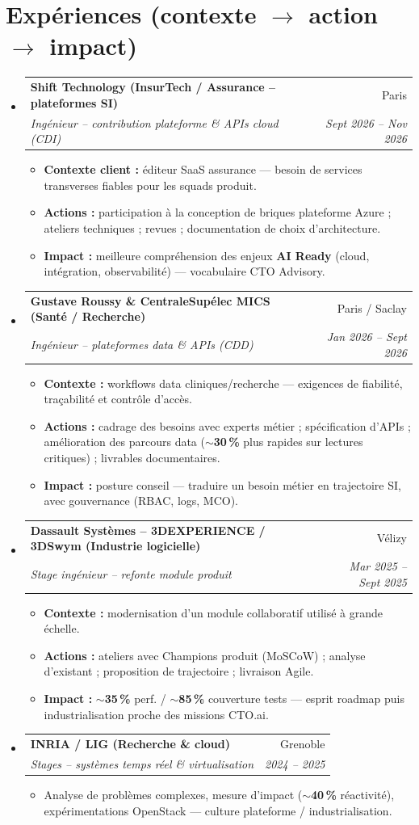 \documentclass[letterpaper,10.5pt]{article}
\makeatletter
\newcommand{\resumeItem}[1]{\item\small{#1 \vspace{-2pt}}}
\newcommand{\resumeSubheading}[4]{\vspace{-2pt}\item\begin{tabular*}{0.97\textwidth}[t]{l@{\extracolsep{\fill}}r}\textbf{#1} & #2 \\\textit{\small#3} & \textit{\small #4} \\\end{tabular*}\vspace{-6pt}}
\newcommand{\resumeSubHeadingListStart}{\begin{itemize}[leftmargin=0.12in, label={}]}
\newcommand{\resumeSubHeadingListEnd}{\end{itemize}}
\newcommand{\resumeItemListStart}{\begin{itemize}[leftmargin=0.15in]}
\newcommand{\resumeItemListEnd}{\end{itemize}\vspace{-4pt}}
\makeatother
\begin{document}
\section{Exp\'eriences (contexte $\rightarrow$ action $\rightarrow$ impact)}
\resumeSubHeadingListStart
  \resumeSubheading{Shift Technology (InsurTech / Assurance -- plateformes SI)}{Paris}{Ing\'enieur -- contribution plateforme \& APIs cloud (CDI)}{Sept 2026 -- Nov 2026}
    \resumeItemListStart
      \resumeItem{\textbf{Contexte client :} \'editeur SaaS assurance --- besoin de services transverses fiables pour les squads produit.}
      \resumeItem{\textbf{Actions :} participation \`a la conception de briques plateforme Azure ; ateliers techniques ; revues ; documentation de choix d'architecture.}
      \resumeItem{\textbf{Impact :} meilleure compr\'ehension des enjeux \textbf{AI Ready} (cloud, int\'egration, observabilit\'e) --- vocabulaire CTO Advisory.}
    \resumeItemListEnd
  \resumeSubheading{Gustave Roussy \& CentraleSup\'elec MICS (Sant\'e / Recherche)}{Paris / Saclay}{Ing\'enieur -- plateformes data \& APIs (CDD)}{Jan 2026 -- Sept 2026}
    \resumeItemListStart
      \resumeItem{\textbf{Contexte :} workflows data cliniques/recherche --- exigences de fiabilit\'e, tra\c{c}abilit\'e et contr\^ole d'acc\`es.}
      \resumeItem{\textbf{Actions :} cadrage des besoins avec experts m\'etier ; sp\'ecification d'APIs ; am\'elioration des parcours data (\textbf{$\sim$30\,\%} plus rapides sur lectures critiques) ; livrables documentaires.}
      \resumeItem{\textbf{Impact :} posture conseil --- traduire un besoin m\'etier en trajectoire SI, avec gouvernance (RBAC, logs, MCO).}
    \resumeItemListEnd
  \resumeSubheading{Dassault Syst\`emes -- 3DEXPERIENCE / 3DSwym (Industrie logicielle)}{V\'elizy}{Stage ing\'enieur -- refonte module produit}{Mar 2025 -- Sept 2025}
    \resumeItemListStart
      \resumeItem{\textbf{Contexte :} modernisation d'un module collaboratif utilis\'e \`a grande \'echelle.}
      \resumeItem{\textbf{Actions :} ateliers avec Champions produit (MoSCoW) ; analyse d'existant ; proposition de trajectoire ; livraison Agile.}
      \resumeItem{\textbf{Impact :} \textbf{$\sim$35\,\%} perf. / \textbf{$\sim$85\,\%} couverture tests --- esprit \guillemotleft{}roadmap puis industrialisation\guillemotright{} proche des missions CTO.ai.}
    \resumeItemListEnd
  \resumeSubheading{INRIA / LIG (Recherche \& cloud)}{Grenoble}{Stages -- syst\`emes temps r\'eel \& virtualisation}{2024 -- 2025}
    \resumeItemListStart
      \resumeItem{Analyse de probl\`emes complexes, mesure d'impact (\textbf{$\sim$40\,\%} r\'eactivit\'e), exp\'erimentations OpenStack --- culture plateforme / industrialisation.}
    \resumeItemListEnd
\resumeSubHeadingListEnd
\end{document}
